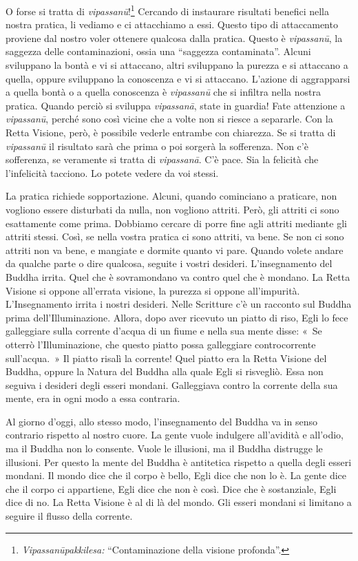 O forse si tratta di \emph{vipassanū}!\footnote{\emph{Vipassanūpakkilesa:}
  ``Contaminazione della visione profonda''.} Cercando di instaurare
risultati benefici nella nostra pratica, li vediamo e ci attacchiamo a
essi. Questo tipo di attaccamento proviene dal nostro voler ottenere
qualcosa dalla pratica. Questo è \emph{vipassanū}, la saggezza delle
contaminazioni, ossia una ``saggezza contaminata''. Alcuni sviluppano la
bontà e vi si attaccano, altri sviluppano la purezza e si attaccano a
quella, oppure sviluppano la conoscenza e vi si attaccano. L'azione di
aggrapparsi a quella bontà o a quella conoscenza è \emph{vipassanū} che
si infiltra nella nostra pratica. Quando perciò si sviluppa
\emph{vipassanā}, state in guardia! Fate attenzione a \emph{vipassanū},
perché sono così vicine che a volte non si riesce a separarle. Con la
Retta Visione, però, è possibile vederle entrambe con chiarezza. Se si
tratta di \emph{vipassanū} il risultato sarà che prima o poi sorgerà la
sofferenza. Non c'è sofferenza, se veramente si tratta di
\emph{vipassanā}. C'è pace. Sia la felicità che l'infelicità tacciono.
Lo potete vedere da voi stessi.

La pratica richiede sopportazione. Alcuni, quando cominciano a
praticare, non vogliono essere disturbati da nulla, non vogliono
attriti. Però, gli attriti ci sono esattamente come prima. Dobbiamo
cercare di porre fine agli attriti mediante gli attriti stessi. Così, se
nella vostra pratica ci sono attriti, va bene. Se non ci sono attriti
non va bene, e mangiate e dormite quanto vi pare. Quando volete andare
da qualche parte o dire qualcosa, seguite i vostri desideri.
L'insegnamento del Buddha irrita. Quel che è sovramondano va contro
quel che è mondano. La Retta Visione si oppone all'errata visione, la
purezza si oppone all'impurità. L'Insegnamento irrita i nostri desideri.
Nelle Scritture c'è un racconto sul Buddha prima dell'Illuminazione.
Allora, dopo aver ricevuto un piatto di riso, Egli lo fece galleggiare
sulla corrente d'acqua di un fiume e nella sua mente disse: «~Se otterrò
l'Illuminazione, che questo piatto possa galleggiare controcorrente
sull'acqua.~» Il piatto risalì la corrente! Quel piatto era la Retta
Visione del Buddha, oppure la Natura del Buddha alla quale Egli si
risvegliò. Essa non seguiva i desideri degli esseri mondani. Galleggiava
contro la corrente della sua mente, era in ogni modo a essa contraria.

Al giorno d'oggi, allo stesso modo, l'insegnamento del Buddha va in
senso contrario rispetto al nostro cuore. La gente vuole indulgere
all'avidità e all'odio, ma il Buddha non lo consente. Vuole le
illusioni, ma il Buddha distrugge le illusioni. Per questo la mente del
Buddha è antitetica rispetto a quella degli esseri mondani. Il mondo
dice che il corpo è bello, Egli dice che non lo è. La gente dice che il
corpo ci appartiene, Egli dice che non è così. Dice che è sostanziale,
Egli dice di no. La Retta Visione è al di là del mondo. Gli esseri
mondani si limitano a seguire il flusso della corrente.

